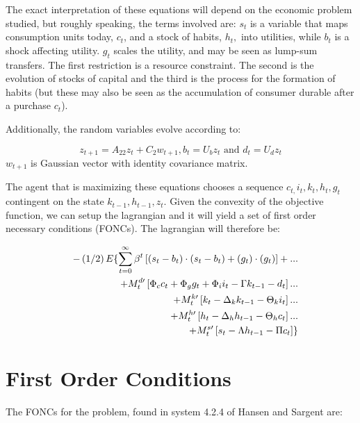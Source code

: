 \documentclass[letter, fleqn, 11pt]{article}
\begin{document}
The exact interpretation of these equations will depend on the economic problem studied, but roughly speaking, the terms involved are: $s_{t}$ is a variable
that maps consumption units today, $c_{t}$, and a stock of habits, $h_{t},$ into utilities, while $b_{t}$ is a shock affecting utility. $g_{t}$
scales the utility, and may be seen as lump-sum transfers. The first restriction is a resource constraint. The second is the evolution of stocks
of capital and the third is the process for the formation of habits (but these may also be seen as the accumulation of consumer durable after a
purchase $c_{t}$)$.$

Additionally, the random variables evolve according to:

\begin{equation*}
z_{t+1}=A_{22}z_{t}+C_{2}w_{t+1},b_{t}=U_{b}z_{t}\text{ and }d_{t}=U_{d}z_{t}
\end{equation*}%
$w_{t+1}$ is Gaussian vector with identity covariance matrix.

The agent that is maximizing these equations chooses a sequence $%
c_{t,}i_{t},k_{t},h_{t},g_{t}$ contingent on the state $%
k_{t-1},h_{t-1},z_{t} $. Given the convexity of the objective function, we can setup the lagrangian and it will yield a set of first order
necessary conditions (FONCs). The lagrangian will therefore be:

\begin{eqnarray*}
&&-\left( 1/2\right) E\{\sum_{t=0}^{\infty }\beta ^{t}\left[
(s_{t}-b_{t})\cdot (s_{t}-b_{t})+(g_{t})\cdot (g_{t})\right] +... \\
&&+{\scriptsize M}_{t}^{d\prime }\left[ \Phi _{c}c_{t}+\Phi _{g}g_{t}+\Phi
_{i}i_{t}-\Gamma k_{t-1}-d_{t}\right] ... \\
&&+{\scriptsize M}_{t}^{k\prime }\left[ k_{t}-\Delta _{k}k_{t-1}-\Theta
_{k}i_{t}\right] ... \\
&&+{\scriptsize M}_{t}^{h\prime }\left[ h_{t}-\Delta _{h}h_{t-1}-\Theta
_{h}c_{t}\right] ... \\
&&+{\scriptsize M}_{t}^{s\prime }\left[ s_{t}-\Lambda h_{t-1}-\Pi c_{t}%
\right] \}
\end{eqnarray*}


\section{First Order Conditions}

The FONCs for the problem, found in system 4.2.4 of Hansen and Sargent are:
\end{document}
